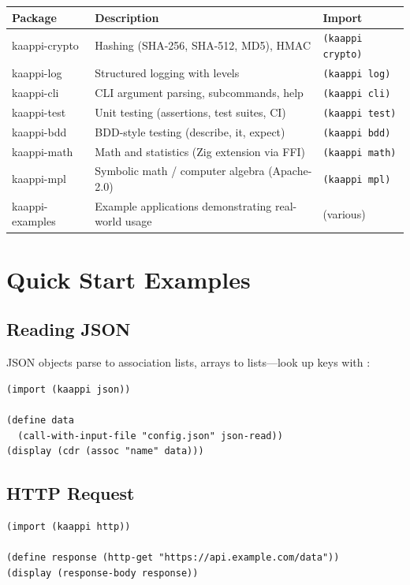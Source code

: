 \begin{center}
\small
\begin{tabularx}{\textwidth}{@{}lYl@{}}
\textbf{Package} & \textbf{Description} & \textbf{Import} \\
\hline
kaappi-crypto & Hashing (SHA-256, SHA-512, MD5), HMAC & \texttt{(kaappi crypto)} \\
kaappi-log & Structured logging with levels & \texttt{(kaappi log)} \\
kaappi-cli & CLI argument parsing, subcommands, help & \texttt{(kaappi cli)} \\
kaappi-test & Unit testing (assertions, test suites, CI) & \texttt{(kaappi test)} \\
kaappi-bdd & BDD-style testing (describe, it, expect) & \texttt{(kaappi bdd)} \\
kaappi-math & Math and statistics (Zig extension via FFI) & \texttt{(kaappi math)} \\
kaappi-mpl & Symbolic math / computer algebra (Apache-2.0) & \texttt{(kaappi mpl)} \\
kaappi-examples & Example applications demonstrating real-world usage & (various) \\
\end{tabularx}
\end{center}

\section{Quick Start Examples}

\subsection{Reading JSON}

JSON objects parse to association lists, arrays to lists---look up keys with :

\begin{lstlisting}
(import (kaappi json))

(define data
  (call-with-input-file "config.json" json-read))
(display (cdr (assoc "name" data)))
\end{lstlisting}

\subsection{HTTP Request}

\begin{lstlisting}
(import (kaappi http))

(define response (http-get "https://api.example.com/data"))
(display (response-body response))
\end{lstlisting}

